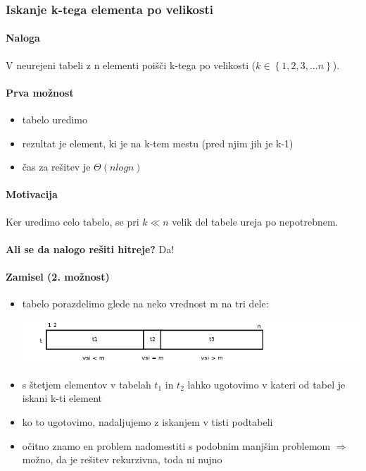 \documentclass[a4paper,10pt]{article}
\begin{document}
\subsubsection{Iskanje k-tega elementa po velikosti}
\paragraph{Naloga}
V neurejeni tabeli z n elementi poi\v s\v ci k-tega po velikosti ($k \in \left\lbrace 1, 2, 3,... n \right\rbrace $).

\paragraph{Prva mo\v znost}
\begin{itemize}
\item tabelo uredimo
\item rezultat je element, ki je na k-tem mestu (pred njim jih je k-1)
\item \v cas za re\v sitev je $\Theta (n log n)$
\end{itemize}

\paragraph{Motivacija}
Ker uredimo celo tabelo, se pri $k \ll n$ velik del tabele ureja po nepotrebnem.\\
\\
\textbf{Ali se da nalogo re\v siti hitreje?} Da!

\paragraph{Zamisel (2. mo\v znost)}
\begin{itemize}
\item tabelo porazdelimo glede na neko vrednost m na tri dele:
	\begin{center}
	\includegraphics[width=13.35cm,height=1.65cm]{Slike/IskanjeKTegaElementa.png}
	\end{center}
\item s \v stetjem elementov v tabelah $t_1$ in $t_2$ lahko ugotovimo v kateri od tabel je iskani k-ti element
\item ko to ugotovimo, nadaljujemo z iskanjem v tisti podtabeli
\item o\v citno znamo en problem nadomestiti s podobnim manj\v sim problemom $\Rightarrow$ mo\v zno, da je re\v sitev rekurzivna, toda ni nujno
\end{itemize}
\end{document}
